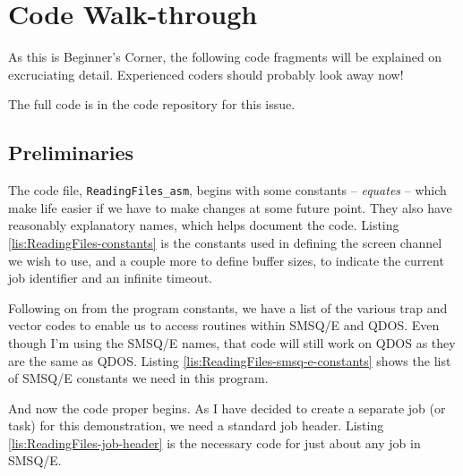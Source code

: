 \section{Code Walk-through}

As this is Beginner's Corner, the following code fragments will be
explained on excruciating detail. Experienced coders should probably
look away now!

The full code is in the code repository for this issue.

\subsection{Preliminaries}

The code file, \texttt{ReadingFiles\_asm}, begins with some constants
-- \emph{equates} -- which make life easier if we have to make changes
at some future point. They also have reasonably explanatory names,
which helps document the code. Listing \ref{lis:ReadingFiles-constants}
is the constants used in defining the screen channel we wish to use,
and a couple more to define buffer sizes, to indicate the current
job identifier and an infinite timeout.



Following on from the program constants, we have a list of the various
trap and vector codes to enable us to access routines within SMSQ/E
and QDOS. Even though I'm using the SMSQ/E names, that code will still
work on QDOS as they are the same as QDOS. Listing \ref{lis:ReadingFiles-smsq-e-constants}
shows the list of SMSQ/E constants we need in this program.



And now the code proper begins. As I have decided to create a separate
job (or task) for this demonstration, we need a standard job header.
Listing \ref{lis:ReadingFiles-job-header} is the necessary code for
just about any job in SMSQ/E.



